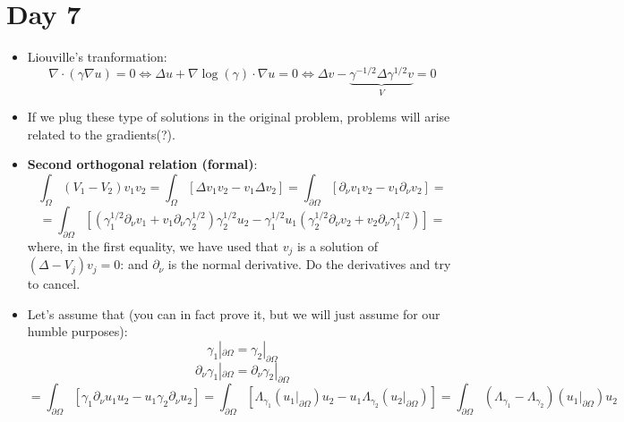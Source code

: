 \documentclass{article}
\begin{document}
\section*{Day 7}
\begin{itemize}
    \item Liouville's tranformation:
    \begin{equation}
        \nabla \cdot (\gamma \nabla u) = 0 \iff \Delta u + \nabla \log (\gamma) \cdot \nabla u = 0 \iff \Delta v - \underbrace{\gamma^{-1/2} \Delta \gamma^{1/2} v }_{V} = 0
    \end{equation}
    
    \item If we plug these type of solutions in the original problem, problems will arise related to the gradients(?).

    \item \textbf{Second orthogonal relation (formal)}: 
    \begin{equation}
        \int_\Omega (V_1 - V_2) v_1 v_2 = \int_\Omega [\Delta v_1 v_2 - v_1 \Delta v_2 ] = \int_{\partial\Omega} [ \partial_\nu v_1 v_2 - v_1 \partial_\nu v_2] = 
    \end{equation}
    \begin{equation}
        = \int_{\partial\Omega} [ (\gamma_1^{1/2} \partial_\nu v_1 + v_1 \partial_ \nu\gamma_2^{1/2}) \gamma_2^{1/2} u_2 - \gamma_1^{1/2} u_1 (\gamma_2^{1/2} \partial_\nu v_2 + v_2 \partial_ \nu\gamma_1^{1/2})] = 
    \end{equation}
    where, in the first equality, we have used that $v_j$ is a solution of $(\Delta - V_j)v_j = 0$: and $\partial_\nu$ is the normal derivative. Do the derivatives and try to cancel.

    \item Let's assume that (you can in fact prove it, but we will just assume for our humble purposes):
    \begin{equation}
        \gamma_1|_{\partial\Omega} = \gamma_2|_{\partial\Omega}
    \end{equation}
        \begin{equation}
        \partial_\nu\gamma_1|_{\partial\Omega} = \partial_\nu\gamma_2|_{\partial\Omega}
    \end{equation}
    \begin{equation}
        = \int_{\partial\Omega} [\gamma_1 \partial_\nu u_1 u_2 - u_1 \gamma_2 \partial_\nu  u_2] = \int_{\partial\Omega} [\Lambda_{\gamma_1}(u_1|_{\partial\Omega}) u_2 - u_1 \Lambda_{\gamma_2}(u_2|_{\partial\Omega}) ] = \int_{\partial\Omega} (\Lambda_{\gamma_1}- \Lambda_{\gamma_2}) (u_1|_{\partial\Omega}) u_2
    \end{equation}


\end{itemize}
\end{document}
